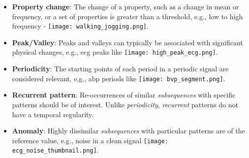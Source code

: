 \begin{itemize}
  \item \textbf{Property change}: The change of a property, such as a change in mean or frequency, or a set of properties is greater than a threshold, e.g., \textcolor{myblue}{low} to \textcolor{mygreen}{high} frequency - \texttt{[image: walking\_jogging.png]}.
  \item \textbf{Peak/Valley}: Peaks and valleys can typically be associated with significant physical changes, e.g., \gls{ecg} \textcolor{mygreen2}{peaks} like \texttt{[image: high\_peak\_ecg.png]}.
  \item \textbf{Periodicity}: The starting points of each period in a periodic signal are considered relevant, e.g., \gls{abp} periods like \texttt{[image: bvp\_segment.png]}.
  \item \textbf{Recurrent pattern}: Re-occurrences of similar \textit{subsequences} with specific patterns should be of interest. Unlike \textit{periodicity}, \textit{recurrent} patterns do not have a temporal regularity.
  \item \textbf{Anomaly}: Highly dissimilar \textit{subsequences} with particular patterns are of the reference value, e.g., \textcolor{myred}{noise} in a clean signal \texttt{[image: ecg\_noise\_thumbnail.png]}.
\end{itemize}


